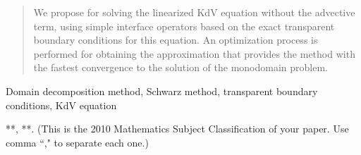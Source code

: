 \begin{abstract}
We propose   for solving  the linearized KdV equation without the advective term, using simple interface operators based on the exact transparent boundary conditions for this equation. An optimization process is performed for obtaining the approximation that provides the method with the fastest convergence to the solution of the monodomain problem.
\end{abstract}

\begin{keyword}
Domain decomposition method, Schwarz method, transparent boundary conditions, KdV equation
\end{keyword}

\begin{MSC}
**, **.
(This is the 2010 Mathematics Subject Classification of your paper. Use comma ``," to separate each one.)
\end{MSC}